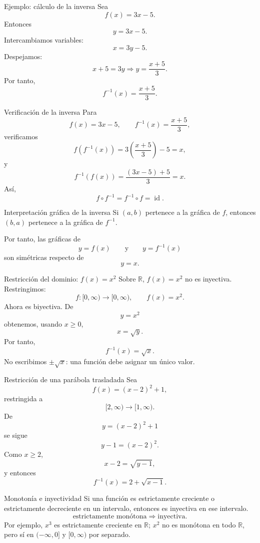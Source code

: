 \documentclass[aspectratio=169,10pt]{beamer}
\begin{document}
\begin{frame}{Ejemplo: cálculo de la inversa}
Sea
\[
f(x)=3x-5.
\]
Entonces
\[
y=3x-5.
\]
Intercambiamos variables:
\[
x=3y-5.
\]
Despejamos:
\[
x+5=3y\Longrightarrow y=\frac{x+5}{3}.
\]
Por tanto,
\[
\boxed{f^{-1}(x)=\frac{x+5}{3}.}
\]
\end{frame}

\begin{frame}{Verificación de la inversa}
Para
\[
f(x)=3x-5,\qquad f^{-1}(x)=\frac{x+5}{3},
\]
verificamos
\[
f(f^{-1}(x))=3\left(\frac{x+5}{3}\right)-5=x,
\]
y
\[
f^{-1}(f(x))=\frac{(3x-5)+5}{3}=x.
\]
Así,
\[
\boxed{f\circ f^{-1}=f^{-1}\circ f=\operatorname{id}.}
\]
\end{frame}

\begin{frame}{Interpretación gráfica de la inversa}
Si $(a,b)$ pertenece a la gráfica de $f$, entonces $(b,a)$ pertenece a la gráfica de $f^{-1}$.

Por tanto, las gráficas de
\[
y=f(x)\qquad\text{y}\qquad y=f^{-1}(x)
\]
son simétricas respecto de
\[
\boxed{y=x}.
\]
\end{frame}

\begin{frame}{Restricción del dominio: $f(x)=x^2$}
Sobre $\mathbb R$, $f(x)=x^2$ no es inyectiva. Restringimos:
\[
f:[0,\infty)\to[0,\infty),\qquad f(x)=x^2.
\]
Ahora es biyectiva. De
\[
y=x^2
\]
obtenemos, usando $x\ge0$,
\[
x=\sqrt y.
\]
Por tanto,
\[
\boxed{f^{-1}(x)=\sqrt x.}
\]
No escribimos $\pm\sqrt x$: una función debe asignar un único valor.
\end{frame}

\begin{frame}{Restricción de una parábola trasladada}
Sea
\[
f(x)=(x-2)^2+1,
\]
restringida a
\[
[2,\infty)\to[1,\infty).
\]
De
\[
y=(x-2)^2+1
\]
se sigue
\[
y-1=(x-2)^2.
\]
Como $x\ge2$,
\[
x-2=\sqrt{y-1},
\]
y entonces
\[
\boxed{f^{-1}(x)=2+\sqrt{x-1}.}
\]
\end{frame}

\begin{frame}{Monotonía e inyectividad}
Si una función es estrictamente creciente o estrictamente decreciente en un intervalo, entonces es inyectiva en ese intervalo.
\[
\boxed{\text{estrictamente monótona}\Longrightarrow\text{inyectiva}.}
\]
Por ejemplo, $x^3$ es estrictamente creciente en $\mathbb R$; $x^2$ no es monótona en todo $\mathbb R$, pero sí en $(-\infty,0]$ y $[0,\infty)$ por separado.
\end{frame}
\end{document}
